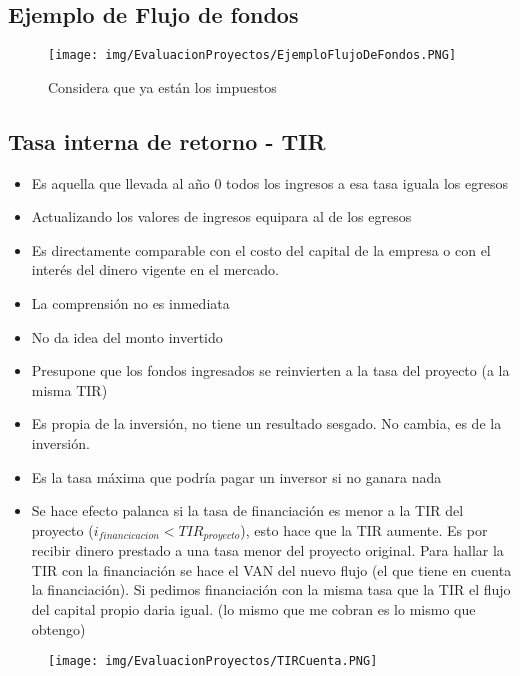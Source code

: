 \documentclass[titlepage,a4paper]{article}
\begin{document}
\subsection{Ejemplo de Flujo de fondos}

\begin{figure}[!htb]
    \centering
    \texttt{[image: img/EvaluacionProyectos/EjemploFlujoDeFondos.PNG]}
    \caption{Considera que ya están los impuestos}
\end{figure}

\newpage
\subsection{Tasa interna de retorno - TIR}

\begin{itemize}
\item Es aquella que llevada al año 0 todos los ingresos a esa tasa iguala los egresos
\item Actualizando los valores de ingresos equipara al de los egresos
\item Es directamente comparable con el costo del capital de la empresa o con el interés del dinero vigente en el mercado.
\item La comprensión no es inmediata
\item No da idea del monto invertido
\item Presupone que los fondos ingresados se reinvierten a la tasa del proyecto (a la misma TIR)
\item Es propia de la inversión, no tiene un resultado sesgado. No cambia, es de la inversión.
\item Es la tasa máxima que podría pagar un inversor si no ganara nada
\item Se hace efecto palanca si la tasa de financiación es menor a la TIR del proyecto ($i_{financicacion} < TIR_{proyecto}$), esto hace que la TIR aumente. Es por recibir dinero prestado a una tasa menor del proyecto original. Para hallar la TIR con la financiación se hace el VAN del nuevo flujo (el que tiene en cuenta la financiación). Si pedimos financiación con la misma tasa que la TIR el flujo del capital propio daria igual. (lo mismo que me cobran es lo mismo que obtengo)
\end{itemize}

\begin{figure}[!htb]
    \centering
    \texttt{[image: img/EvaluacionProyectos/TIRCuenta.PNG]}
\end{figure}
\end{document}
